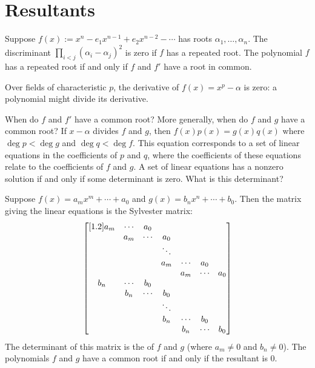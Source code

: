 \documentclass[11pt, oneside,margin=1in]{article}
\begin{document}
\section{Resultants}
Suppose $f(x):= x^n - e_1x^{n-1} + e_2x^{n-2} - \cdots$ has roots $\alpha_1,\hdots,\alpha_n$. The discriminant $\prod _{i<j} (\alpha_i-\alpha_j)^2 $ is zero if $f$ has a repeated root. The polynomial $f$ has a repeated root if and only if $f$ and $f'$ have a root in common. 
\begin{warn}
	Over fields of characteristic $p$, the derivative of $f(x) = x^p-\alpha$ is zero: a polynomial might divide its derivative.
\end{warn}

When do $f$ and $f'$ have a common root? More generally, when do $f$ and $g$ have a common root? If $x-\alpha$ divides $f$ and $g$, then $f(x)p (x) = g (x)q (x)$ where $\deg p < \deg g$ and $\deg q <  \deg f$. This equation corresponds to a set of linear equations in the coefficients of $p$ and $q$, where the coefficients of these equations relate to the coefficients of $f$ and $g$. A set of linear equations has a nonzero solution if and only if some determinant is zero. What is this determinant?

Suppose $f(x) = a_mx^m + \cdots + a_0$ and $g(x) = b_nx^n + \cdots + b_0$. Then the matrix giving the linear equations is the Sylvester matrix:
\begin{align*}
	\begin{bmatrix} [ 1.2 ] a_m & \cdots & a_0 && &&\\ & a_m & \cdots & a_0& &&\\ &&&\ddots&&&\\&&&a_m & \cdots & a_0\\&&&&a_m & \cdots & a_0\\b_n & \cdots & b_0 && &&\\ & b_n & \cdots & b_0& &&\\ &&&\ddots&&&\\&&&b_n & \cdots & b_0\\&&&&b_n & \cdots & b_0 \end{bmatrix}
\end{align*}
The determinant of this matrix is the  of $f$ and $g$ (where $a_m\ne 0$ and $b_n\ne 0$). The polynomials $f$ and $g$ have a common root if and only if the resultant is $0$.
\end{document}
